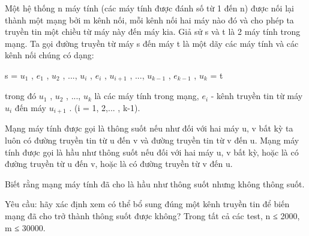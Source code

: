 Một hệ thống n máy tính (các máy tính được đánh số từ 1 đến n) được nối lại thành một mạng bởi m kênh nối, mỗi kênh nối hai máy nào đó và cho phép ta truyền tin một chiều từ máy này đến máy kia. Giả sử s và t là 2 máy tính trong mạng. Ta gọi đường truyền từ máy s đến máy t là một dãy các máy tính và các kênh nối chúng có dạng:  

   s = $u_{1}$   , $e_{1}$   , $u_{2}$   , ..., $u_{i}$   , $e_{i}$   , $u_{i+1}$   , ..., $u_{k-1}$   , $e_{k-1}$   , $u_{k}$   = t  

   trong đó $u_{1}$   , $u_{2}$   , ..., $u_{k}$   là các máy tính trong mạng, $e_{i}$   - kênh truyền tin từ máy $u_{i}$   đến máy $u_{i+1}$   . (i = 1, 2,... , k-1).  

   Mạng máy tính được gọi là thông suốt nếu như đối với hai máy u, v bất kỳ ta luôn có đường truyền tin từ u đến v và đường truyền tin từ v đến u. Mạng máy tính được gọi là hầu như thông suốt nếu đối với hai máy u, v bất kỳ, hoặc là có đường truyền từ u đến v, hoặc là có đường truyền từ v đến u.  

   Biết rằng mạng máy tính đã cho là hầu như thông suốt nhưng không thông suốt.  

   Yêu cầu: hãy xác định xem có thể bổ sung đúng một kênh truyền tin để biến mạng đã cho trở thành thông suốt được không?
Trong tất cả các test, n ≤ 2000, m ≤ 30000.